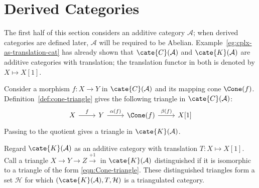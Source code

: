 
\section{Derived Categories}\label{sec:derived-cat}
\hypertarget{o014.aljabr2.chapter4.derived-categories}{ }

The first half of this section considers an additive category $\mathcal{A}$;
when derived categories are defined later, $\mathcal{A}$ will be required to
be Abelian. Example~\ref{eg:cplx-as-translation-cat} has already shown that
$\cate{C}(\mathcal{A})$ and $\cate{K}(\mathcal{A})$ are additive categories
with translation; the translation functor in both is denoted by
$X \mapsto X[1]$.

Consider a morphism $f: X \to Y$ in $\cate{C}(\mathcal{A})$ and its mapping
cone $\Cone(f)$. Definition~\ref{def:cone-triangle} gives the following
triangle in $\cate{C}(\mathcal{A})$:
\begin{equation}\label{eqn:Cone-triangle} \begin{tikzcd}
	X \arrow[r, "f"] & Y \arrow[r, "{\alpha(f)}"] & \Cone(f) \arrow[r, "\beta(f)"] & X[1]
\end{tikzcd}\end{equation}
Passing to the quotient gives a triangle in $\cate{K}(\mathcal{A})$.

\begin{theorem}\label{prop:cplx-triangulated}
	Regard $\cate{K}(\mathcal{A})$ as an additive category with translation
	$T: X \mapsto X[1]$. Call a triangle
	$X \to Y \to Z \xrightarrow{+1}$ in $\cate{K}(\mathcal{A})$
	distinguished if it is isomorphic to a triangle of the form
	\eqref{eqn:Cone-triangle}. These distinguished triangles form a set
	$\mathcal{H}$ for which
	$(\cate{K}(\mathcal{A}), T, \mathcal{H})$ is a triangulated category.
\end{theorem}

